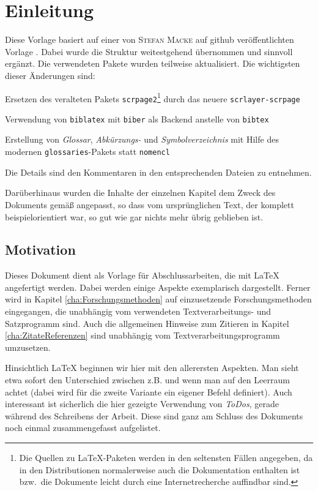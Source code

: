 \chapter{Einleitung}
\label{cha:Einleitung}
%
Diese Vorlage basiert auf einer von \textsc{Stefan Macke} auf \gls{github} veröffentlichten Vorlage
\parencite{Macke2009}. Dabei wurde die Struktur weitestgehend übernommen und sinnvoll ergänzt. Die verwendeten
Pakete wurden teilweise aktualisiert. Die wichtigsten dieser Änderungen sind:
%
\begin{compactitem}[\quad$\star$]
\item Ersetzen des veralteten Pakets \texttt{scrpage2}\footnote{%
Die Quellen zu \LaTeX{}-Paketen werden in den seltensten Fällen angegeben, da in den Distributionen normalerweise auch die Dokumentation enthalten ist bzw.~die Dokumente leicht durch eine Internetrecherche auffindbar sind.}
%
  durch das neuere \texttt{scrlayer-scrpage}
\item Verwendung von \texttt{biblatex} mit \texttt{biber} als Backend anstelle von \texttt{bibtex}
\item Erstellung von \emph{Glossar}, \emph{Abkürzungs-} und \emph{Symbolverzeichnis} mit Hilfe des
  modernen \texttt{glossaries}-Pakets statt \texttt{nomencl}
\end{compactitem}
%
Die Details sind den Kommentaren in den entsprechenden Dateien zu entnehmen.

Darüberhinaus wurden die Inhalte der einzelnen Kapitel dem Zweck des Dokuments gemäß angepasst, so dass
vom ursprünglichen Text, der komplett beispielorientiert war, so gut wie gar nichts mehr übrig geblieben ist.

\section{Motivation}
\label{sec:Einl-Motivation}
%
Dieses Dokument dient als Vorlage für Abschlussarbeiten, die mit \LaTeX{} angefertigt werden. Dabei werden
einige Aspekte exemplarisch dargestellt. Ferner wird in Kapitel \ref{cha:Forschungsmethoden} auf einzusetzende
Forschungsmethoden eingegangen, die unabhängig vom verwendeten Textverarbeitungs- und Satzprogramm sind. Auch
die allgemeinen Hinweise zum Zitieren in Kapitel \ref{cha:ZitateReferenzen} sind unabhängig vom
Textverarbeitungsprogramm umzusetzen.

Hinsichtlich \LaTeX{} beginnen wir hier mit den allerersten Aspekten. Man sieht etwa sofort den Unterschied
zwischen z.B. und \zB wenn man auf den Leerraum achtet (dabei wird für die zweite Variante ein eigener Befehl
definiert).
%
%
Auch interessant ist sicherlich die hier gezeigte Verwendung von \emph{ToDos}, gerade während des Schreibens der Arbeit. Diese sind ganz am Schluss des Dokuments noch einmal zusammengefasst aufgelistet.


